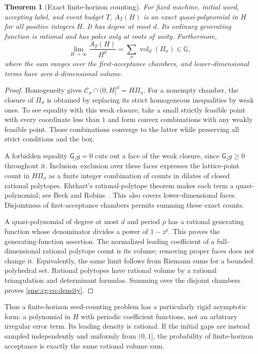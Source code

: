 \documentclass[11pt,letterpaper]{article}
\numberwithin{equation}{section}
\newtheorem{theorem}{Theorem}[section]
\theoremstyle{definition}
\theoremstyle{remark}
\newcommand{\Q}{\mathbb Q}
\newcommand{\Ccal}{\mathcal C}
\newcommand{\vol}{\operatorname{vol}}
\begin{document}
\begin{theorem}[Exact finite-horizon counting]
\label{smc:cg:thm:ehrhart}
For fixed machine, initial word, accepting label, and event budget $T$,
$A_T(H)$ is an exact quasi-polynomial in $H$ for all positive integers $H$.
It has degree at most $d$. Its ordinary generating function is rational and
has poles only at roots of unity. Furthermore,
\begin{equation}
 \lim_{H\to\infty}\frac{A_T(H)}{H^d}
 =\sum_{\sigma}\vol_d(\Pi_\sigma)\in\Q,
 \label{smc:cg:eq:density}
\end{equation}
where the sum ranges over the first-acceptance chambers, and
lower-dimensional terms have zero $d$-dimensional volume.
\end{theorem}
\begin{proof}
Homogeneity gives
$\Ccal_\sigma\cap(0,H]^d=H\Pi_\sigma$.
For a nonempty chamber, the closure of $\Pi_\sigma$ is obtained by replacing
its strict homogeneous inequalities by weak ones. To see equality with this
weak closure, take a small strictly feasible point with every coordinate
less than $1$ and form convex combinations with any weakly feasible point.
Those combinations converge to the latter while preserving all strict
conditions and the box.

A forbidden equality $\mathsf G_jg=0$ cuts out a face of the weak closure,
since $\mathsf G_jg\ge0$ throughout it. Inclusion--exclusion over these faces
expresses the lattice-point count in $H\Pi_\sigma$ as a finite integer
combination of counts in dilates of closed rational polytopes. Ehrhart's
rational-polytope theorem makes each term a quasi-polynomial; see
Beck and Robins~\cite{beckrobins}. This also covers lower-dimensional faces.
Disjointness of first-acceptance chambers permits summing these exact counts.

A quasi-polynomial of degree at most $d$ and period $p$ has a rational
generating function whose denominator divides a power of $1-z^p$.
This proves the generating-function assertion. The normalized leading
coefficient of a full-dimensional rational polytope count is its volume;
removing proper faces does not change it. Equivalently, the same limit follows
from Riemann sums for a bounded polyhedral set. Rational polytopes have
rational volume by a rational triangulation and determinant formulas.
Summing over the disjoint chambers proves \eqref{smc:cg:eq:density}.
\end{proof}

Thus a finite-horizon seed-counting problem has a particularly rigid
asymptotic form: a polynomial in $H$ with periodic coefficient functions,
not an arbitrary irregular error term. Its leading density is rational.
If the initial gaps are instead sampled independently and uniformly from
$(0,1]$, the probability of finite-horizon acceptance is exactly the same
rational volume sum.
\end{document}
